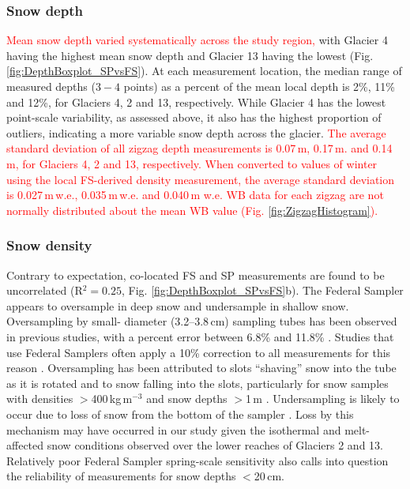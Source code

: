 \documentclass[twocolumn, letterpaper]{igs}
\begin{document}
\subsubsection{Snow depth}
\textcolor{red}{Mean snow depth varied systematically across the study region,} with Glacier 4 having the highest mean snow depth and Glacier 13 having the lowest (Fig. \ref{fig:DepthBoxplot_SPvsFS}). At each measurement location, the median range of measured depths ($3-4$ points) as a percent of the mean local depth is 2\%, 11\% and 12\%, for Glaciers 4, 2 and 13, respectively. While Glacier 4 has the lowest point-scale variability, as assessed above, it also has the highest proportion of outliers, indicating a more variable snow depth across the glacier. \textcolor{red}{The average standard deviation of all zigzag depth measurements is 0.07\,m, 0.17\,m. and 0.14\,m, for Glaciers 4, 2 and 13, respectively. When converted to values of winter using the local FS-derived density measurement, the average standard deviation is 0.027\,m\,w.e., 0.035\,m\,w.e. and 0.040\,m w.e. WB data for each zigzag are not normally distributed about the mean WB value (Fig. \ref{fig:ZigzagHistogram}).}

\subsubsection{Snow density}

Contrary to expectation, co-located FS and SP measurements are found to be uncorrelated (R$^2=0.25$, Fig. \ref{fig:DepthBoxplot_SPvsFS}b). The Federal Sampler appears to oversample in deep snow and undersample in shallow snow. Oversampling by small- diameter (3.2--3.8\,cm) sampling tubes has been observed in previous studies, with a percent error between 6.8\% and 11.8\% \citep[e.g.][]{Work1965, Fames1982, Conger2009}. Studies that use Federal Samplers often apply a 10\% correction to all measurements for this reason \citep[e.g.][]{Molotch2005}. Oversampling has been attributed to slots ``shaving'' snow into the tube as it is rotated \citep[e.g.][]{Dixon2012} and to snow falling into the slots, particularly for snow samples with densities $>$400\,kg\,m$^{-3}$ and snow depths $>$1\,m \citep[e.g.][]{Beaumont1963}. Undersampling is likely to occur due to loss of snow from the bottom of the sampler \citep{Turcan1975}. Loss by this mechanism may have occurred in our study given the isothermal and melt-affected snow conditions observed over the lower reaches of Glaciers 2 and 13. Relatively poor Federal Sampler spring-scale sensitivity also calls into question the reliability of measurements for snow depths $<$20\,cm.
\end{document}

